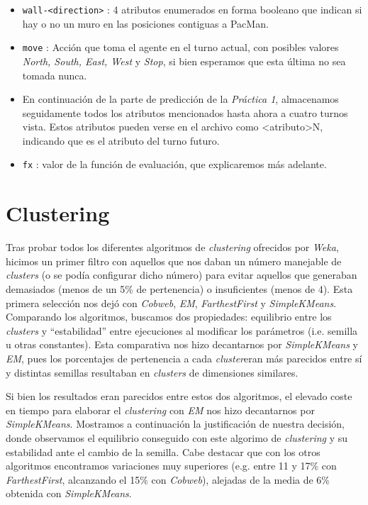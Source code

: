\documentclass[12pt]{article}
\begin{document}
\begin{itemize}
    \item \texttt{wall-\textless direction\textgreater} : 4 atributos enumerados en forma booleano que indican si hay o no un muro en las posiciones contiguas a PacMan.
    \item \texttt{move} : Acción que toma el agente en el turno actual, con posibles valores \emph{North, South, East, West} y \emph {Stop}, si bien esperamos que esta última no sea tomada nunca.
    \item En continuación de la parte de predicción de la \emph{Práctica 1}, almacenamos seguidamente todos los atributos mencionados hasta ahora a cuatro turnos vista. Estos atributos pueden verse en el archivo como \textless atributo\textgreater N, indicando que es el atributo del turno futuro.
    \item \texttt{fx} : valor de la función de evaluación, que explicaremos más adelante.
\end{itemize}

\section{Clustering}


Tras probar todos los diferentes algoritmos de \emph{clustering} ofrecidos por \emph{Weka}, hicimos un primer filtro con aquellos que nos daban un número manejable de \emph{clusters} (o se podía configurar dicho número) para evitar aquellos que generaban demasiados (menos de un 5\% de pertenencia) o insuficientes (menos de 4). Esta primera selección nos dejó con \emph{Cobweb}, \emph{EM}, \emph{FarthestFirst} y \emph{SimpleKMeans}. Comparando los algoritmos, buscamos dos propiedades: equilibrio entre los \emph{clusters} y ``estabilidad'' entre ejecuciones al modificar los parámetros (i.e. semilla u otras constantes). Esta comparativa nos hizo decantarnos por \emph{SimpleKMeans} y \emph{EM}, pues los porcentajes de pertenencia a cada \emph{cluster}eran más parecidos entre sí y distintas semillas resultaban en \emph{clusters} de dimensiones similares.

Si bien los resultados eran parecidos entre estos dos algoritmos, el elevado coste en tiempo para elaborar el \emph{clustering} con \emph{EM} nos hizo decantarnos por \emph{SimpleKMeans}. Mostramos a continuación la justificación de nuestra decisión, donde observamos el equilibrio conseguido con este algorimo de \emph{clustering} y su estabilidad ante el cambio de la semilla. Cabe destacar que con los otros algoritmos encontramos variaciones muy superiores (e.g. entre 11 y 17\% con \emph{FarthestFirst}, alcanzando el 15\% con \emph{Cobweb}), alejadas de la media de 6\% obtenida con \emph{SimpleKMeans}.
\end{document}
